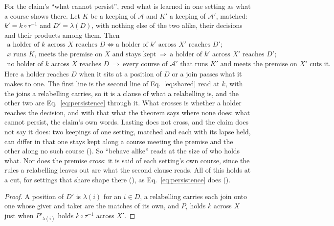 \documentclass[11pt]{amsart}
\newcommand{\Set}{\mathcal{A}}
\theoremstyle{plain}
\begin{document}
For the claim's ``what cannot persist'', read what is learned in one setting as what a course shows there. Let $K$ be a keeping of $\Set$ and $K'$ a keeping of $\Set'$, matched: $k'=k\circ\tau^{-1}$ and $D'=\lambda(D)$, with nothing else of the two alike, their decisions and their products among them. Then
\begin{equation}\label{eq:shared-persistence}
  \begin{gathered}
  \text{a holder of }k\text{ across }X\text{ reaches }D\iff\text{a holder of }k'\text{ across }X'\text{ reaches }D';\\
  x\text{ runs }K\text{, meets the premise on }X\text{ and stays kept}\ \Longrightarrow\ \text{a holder of }k'\text{ across }X'\text{ reaches }D';\\
  \text{no holder of }k\text{ across }X\text{ reaches }D\ \Longrightarrow\ \text{every course of }\Set'\text{ that runs }K'\text{ and meets the premise on }X'\text{ cuts it}.
  \end{gathered}
\end{equation}
Here a holder reaches $D$ when it sits at a position of $D$ or a join passes what it makes to one. The first line is the second line of Eq.~\eqref{eq:shared} read at $k$, with the joins a relabelling carries, so it is a clause of what a relabelling is, and the other two are Eq.~\eqref{eq:persistence} through it. What crosses is whether a holder reaches the decision, and with that what the theorem says where none does: what cannot persist, the claim's own words. Lasting does not cross, and the claim does not say it does: two keepings of one setting, matched and each with its lapse held, can differ in that one stays kept along a course meeting the premise and the other along no such course (). So ``behave alike'' reads at the size of who holds what. Nor does the premise cross: it is said of each setting's own course, since the rules a relabelling leaves out are what the second clause reads. All of this holds at a cut, for settings that share shape there (), as Eq.~\eqref{eq:persistence} does ().

\begin{proof}
A position of $D'$ is $\lambda(i)$ for an $i\in D$, a relabelling carries each join onto one whose giver and taker are the matches of its own, and $P_i$ holds $k$ across $X$ just when $P'_{\lambda(i)}$ holds $k\circ\tau^{-1}$ across $X'$.
\end{proof}
\end{document}
